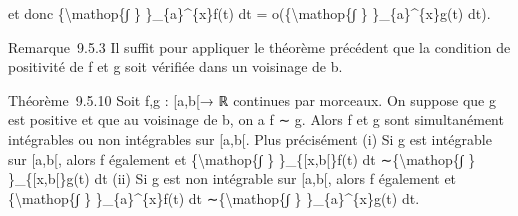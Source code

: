 \documentclass[]{article}
\begin{document}
et donc \{\textbackslash{}mathop\{∫ \} \}\_\{a\}\^{}\{x\}f(t) dt =
o(\{\textbackslash{}mathop\{∫ \} \}\_\{a\}\^{}\{x\}g(t) dt).

Remarque~9.5.3 Il suffit pour appliquer le théorème précédent que la
condition de positivité de f et g soit vérifiée dans un voisinage de b.

Théorème~9.5.10 Soit f,g : {[}a,b{[}→ ℝ continues par morceaux. On
suppose que g est positive et que au voisinage de b, on a f ∼ g. Alors f
et g sont simultanément intégrables ou non intégrables sur {[}a,b{[}.
Plus précisément (i) Si g est intégrable sur {[}a,b{[}, alors f
également et \{\textbackslash{}mathop\{∫ \} \}\_\{{[}x,b{[}\}f(t) dt
∼\{\textbackslash{}mathop\{∫ \} \}\_\{{[}x,b{[}\}g(t) dt (ii) Si g est
non intégrable sur {[}a,b{[}, alors f également et
\{\textbackslash{}mathop\{∫ \} \}\_\{a\}\^{}\{x\}f(t) dt
∼\{\textbackslash{}mathop\{∫ \} \}\_\{a\}\^{}\{x\}g(t) dt.
\end{document}
